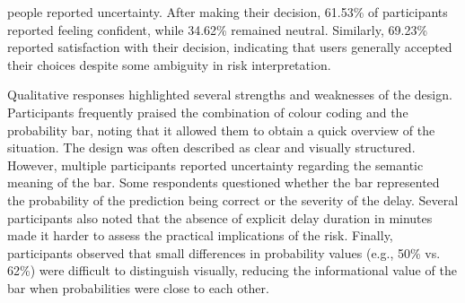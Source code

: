 \documentclass[final,journal,a4paper]{IEEEtran}
\begin{document}
people reported uncertainty. After making their decision, 61.53\% of participants reported feeling confident, while 34.62\% remained neutral. Similarly, 69.23\% reported satisfaction with their decision, indicating that users generally accepted their choices despite some ambiguity in risk interpretation. 

Qualitative responses highlighted several strengths and weaknesses of the design. Participants frequently praised the combination of colour coding and the probability bar, noting that it allowed them to obtain a quick overview of the situation. The design was often described as clear and visually structured. However, multiple participants reported uncertainty regarding the semantic meaning of the bar. Some respondents questioned whether the bar represented the probability of the prediction being correct or the severity of the delay. Several participants also noted that the absence of explicit delay duration in minutes made it harder to assess the practical implications of the risk. Finally, participants observed that small differences in probability values (e.g., 50\% vs. 62\%) were difficult to distinguish visually, reducing the informational value of the bar when probabilities were close to each other.
\end{document}
